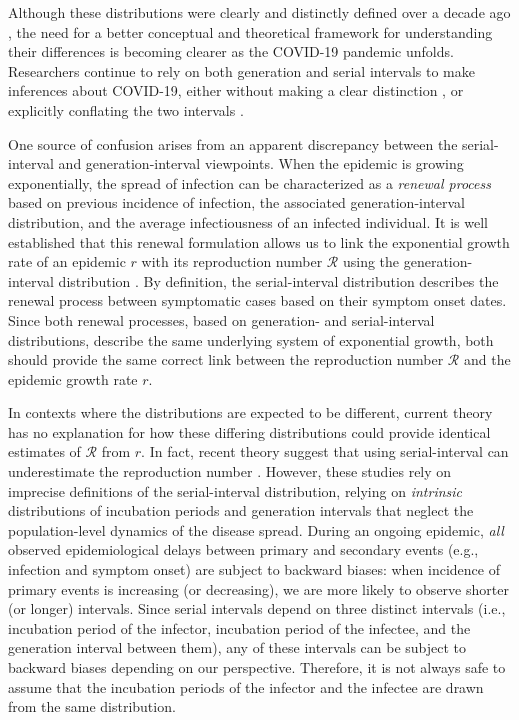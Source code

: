 \documentclass[12pt]{article}
\newcommand{\RR}{\ensuremath{{\mathcal R}}\xspace}
\begin{document}
Although these distributions were clearly and distinctly defined over a decade ago \citep{svensson2007note}, 
the need for a better conceptual and theoretical framework for understanding their differences is becoming clearer as the COVID-19 pandemic unfolds.
Researchers continue to rely on both generation and serial intervals to make inferences about COVID-19, either without making a clear distinction \citep{tempvar,du2020serial,he2020temporal,wu2020nowcasting,zhao2020serial}, or explicitly conflating the two intervals
\citep{anderson2020will,hellewell2020feasibility}.

One source of confusion arises from an apparent discrepancy between the serial-interval and generation-interval viewpoints.
When the epidemic is growing exponentially, the spread of infection can be characterized as a \emph{renewal process} based on previous incidence of infection, the associated generation-interval distribution, and the average infectiousness of an infected individual.
It is well established that this renewal formulation allows us to link the exponential growth rate of an epidemic $r$ with its reproduction number \RR using the generation-interval distribution \citep{wallinga2007generation}.
By definition, the serial-interval distribution describes the renewal process between symptomatic cases based on their symptom onset dates.
Since both renewal processes, based on generation- and serial-interval distributions, describe the same underlying system of exponential growth, both should provide the same correct link between the reproduction number \RR and the epidemic growth rate $r$.

In contexts where the distributions are expected to be different, current theory has no explanation for how these differing distributions could provide identical estimates of \RR from $r$.
In fact, recent theory suggest that using serial-interval can underestimate the reproduction number \citep{britton2019estimation, ganyani2020estimating}.
However, these studies rely on imprecise definitions of the serial-interval distribution, relying on \emph{intrinsic} distributions of incubation periods and generation intervals that neglect the population-level dynamics of the disease spread.
During an ongoing epidemic, \emph{all} observed epidemiological delays between primary and secondary events (e.g., infection and symptom onset) are subject to backward biases: when incidence of primary events is increasing (or decreasing), we are more likely to observe shorter (or longer) intervals.
Since serial intervals depend on three distinct intervals (i.e., incubation period of the infector, incubation period of the infectee, and the generation interval between them), any of these intervals can be subject to backward biases depending on our perspective.
Therefore, it is not always safe to assume that the incubation periods of the infector and the infectee are drawn from the same distribution.
\end{document}
